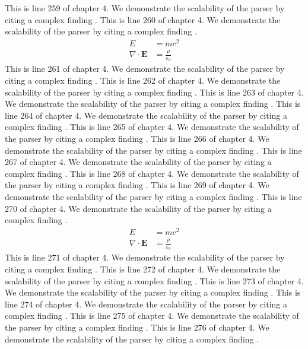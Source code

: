 This is line 259 of chapter 4. We demonstrate the scalability of the parser by citing a complex finding \cite{ref4_259}.
This is line 260 of chapter 4. We demonstrate the scalability of the parser by citing a complex finding \cite{ref4_260}.
\begin{align*}
  E &= mc^2 \\
  \nabla \cdot \mathbf{E} &= \frac{\rho}{\varepsilon_0}
\end{align*}
This is line 261 of chapter 4. We demonstrate the scalability of the parser by citing a complex finding \cite{ref4_261}.
This is line 262 of chapter 4. We demonstrate the scalability of the parser by citing a complex finding \cite{ref4_262}.
This is line 263 of chapter 4. We demonstrate the scalability of the parser by citing a complex finding \cite{ref4_263}.
This is line 264 of chapter 4. We demonstrate the scalability of the parser by citing a complex finding \cite{ref4_264}.
This is line 265 of chapter 4. We demonstrate the scalability of the parser by citing a complex finding \cite{ref4_265}.
This is line 266 of chapter 4. We demonstrate the scalability of the parser by citing a complex finding \cite{ref4_266}.
This is line 267 of chapter 4. We demonstrate the scalability of the parser by citing a complex finding \cite{ref4_267}.
This is line 268 of chapter 4. We demonstrate the scalability of the parser by citing a complex finding \cite{ref4_268}.
This is line 269 of chapter 4. We demonstrate the scalability of the parser by citing a complex finding \cite{ref4_269}.
This is line 270 of chapter 4. We demonstrate the scalability of the parser by citing a complex finding \cite{ref4_270}.
\begin{align*}
  E &= mc^2 \\
  \nabla \cdot \mathbf{E} &= \frac{\rho}{\varepsilon_0}
\end{align*}
This is line 271 of chapter 4. We demonstrate the scalability of the parser by citing a complex finding \cite{ref4_271}.
This is line 272 of chapter 4. We demonstrate the scalability of the parser by citing a complex finding \cite{ref4_272}.
This is line 273 of chapter 4. We demonstrate the scalability of the parser by citing a complex finding \cite{ref4_273}.
This is line 274 of chapter 4. We demonstrate the scalability of the parser by citing a complex finding \cite{ref4_274}.
This is line 275 of chapter 4. We demonstrate the scalability of the parser by citing a complex finding \cite{ref4_275}.
This is line 276 of chapter 4. We demonstrate the scalability of the parser by citing a complex finding \cite{ref4_276}.
